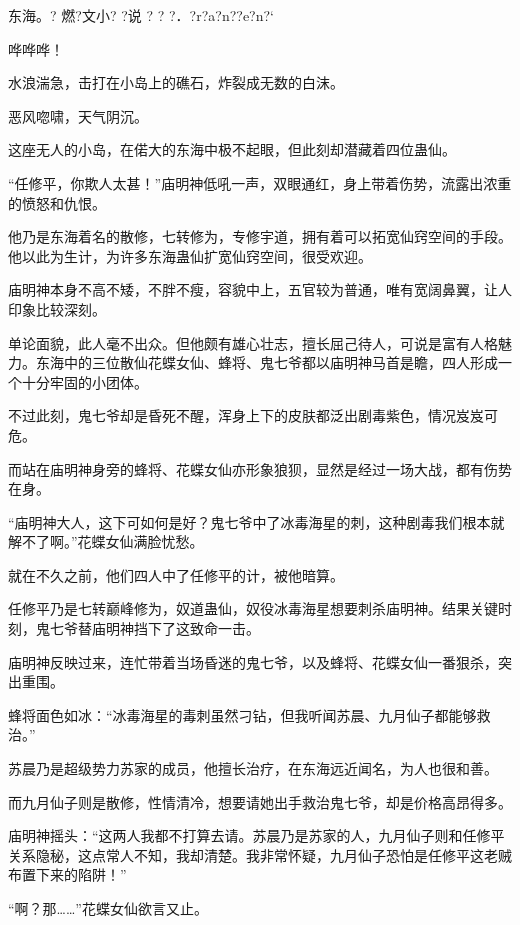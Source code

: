 
\begin{this_body}

东海。?  燃?文小? ?说  ? ? ?．?r?a?n??e?n?`

哗哗哗！

水浪湍急，击打在小岛上的礁石，炸裂成无数的白沫。

恶风唿啸，天气阴沉。

这座无人的小岛，在偌大的东海中极不起眼，但此刻却潜藏着四位蛊仙。

“任修平，你欺人太甚！”庙明神低吼一声，双眼通红，身上带着伤势，流露出浓重的愤怒和仇恨。

他乃是东海着名的散修，七转修为，专修宇道，拥有着可以拓宽仙窍空间的手段。他以此为生计，为许多东海蛊仙扩宽仙窍空间，很受欢迎。

庙明神本身不高不矮，不胖不瘦，容貌中上，五官较为普通，唯有宽阔鼻翼，让人印象比较深刻。

单论面貌，此人毫不出众。但他颇有雄心壮志，擅长屈己待人，可说是富有人格魅力。东海中的三位散仙花蝶女仙、蜂将、鬼七爷都以庙明神马首是瞻，四人形成一个十分牢固的小团体。

不过此刻，鬼七爷却是昏死不醒，浑身上下的皮肤都泛出剧毒紫色，情况岌岌可危。

而站在庙明神身旁的蜂将、花蝶女仙亦形象狼狈，显然是经过一场大战，都有伤势在身。

“庙明神大人，这下可如何是好？鬼七爷中了冰毒海星的刺，这种剧毒我们根本就解不了啊。”花蝶女仙满脸忧愁。

就在不久之前，他们四人中了任修平的计，被他暗算。

任修平乃是七转巅峰修为，奴道蛊仙，奴役冰毒海星想要刺杀庙明神。结果关键时刻，鬼七爷替庙明神挡下了这致命一击。

庙明神反映过来，连忙带着当场昏迷的鬼七爷，以及蜂将、花蝶女仙一番狠杀，突出重围。

蜂将面色如冰：“冰毒海星的毒刺虽然刁钻，但我听闻苏晨、九月仙子都能够救治。”

苏晨乃是超级势力苏家的成员，他擅长治疗，在东海远近闻名，为人也很和善。

而九月仙子则是散修，性情清冷，想要请她出手救治鬼七爷，却是价格高昂得多。

庙明神摇头：“这两人我都不打算去请。苏晨乃是苏家的人，九月仙子则和任修平关系隐秘，这点常人不知，我却清楚。我非常怀疑，九月仙子恐怕是任修平这老贼布置下来的陷阱！”

“啊？那……”花蝶女仙欲言又止。


\end{this_body}
